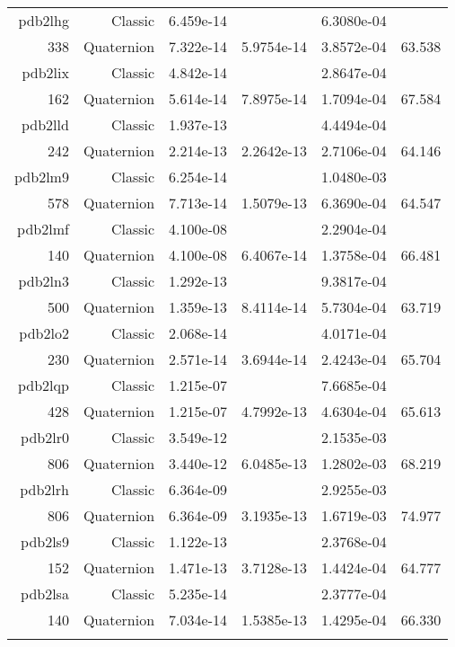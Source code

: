 \begin{xltabular}{\textwidth}{r|rS[table-format=1.3e+2]S[table-format=1.4e+2]S[table-format=1.4e+2]S[table-format=-1.3]}
pdb2lhg & Classic & 6.459e-14 &  & 6.3080e-04 & \\
338 & Quaternion & 7.322e-14 & 5.9754e-14 & 3.8572e-04 & 63.538\\  \addlinespace
pdb2lix & Classic & 4.842e-14 &  & 2.8647e-04 & \\
162 & Quaternion & 5.614e-14 & 7.8975e-14 & 1.7094e-04 & 67.584\\  \addlinespace
pdb2lld & Classic & 1.937e-13 &  & 4.4494e-04 & \\
242 & Quaternion & 2.214e-13 & 2.2642e-13 & 2.7106e-04 & 64.146\\  \addlinespace
pdb2lm9 & Classic & 6.254e-14 &  & 1.0480e-03 & \\
578 & Quaternion & 7.713e-14 & 1.5079e-13 & 6.3690e-04 & 64.547\\  \addlinespace
pdb2lmf & Classic & 4.100e-08 &  & 2.2904e-04 & \\
140 & Quaternion & 4.100e-08 & 6.4067e-14 & 1.3758e-04 & 66.481\\  \addlinespace
pdb2ln3 & Classic & 1.292e-13 &  & 9.3817e-04 & \\
500 & Quaternion & 1.359e-13 & 8.4114e-14 & 5.7304e-04 & 63.719\\  \addlinespace
pdb2lo2 & Classic & 2.068e-14 &  & 4.0171e-04 & \\
230 & Quaternion & 2.571e-14 & 3.6944e-14 & 2.4243e-04 & 65.704\\  \addlinespace
pdb2lqp & Classic & 1.215e-07 &  & 7.6685e-04 & \\
428 & Quaternion & 1.215e-07 & 4.7992e-13 & 4.6304e-04 & 65.613\\  \addlinespace
pdb2lr0 & Classic & 3.549e-12 &  & 2.1535e-03 & \\
806 & Quaternion & 3.440e-12 & 6.0485e-13 & 1.2802e-03 & 68.219\\  \addlinespace
pdb2lrh & Classic & 6.364e-09 &  & 2.9255e-03 & \\
806 & Quaternion & 6.364e-09 & 3.1935e-13 & 1.6719e-03 & 74.977\\  \addlinespace
pdb2ls9 & Classic & 1.122e-13 &  & 2.3768e-04 & \\
152 & Quaternion & 1.471e-13 & 3.7128e-13 & 1.4424e-04 & 64.777\\  \addlinespace
pdb2lsa & Classic & 5.235e-14 &  & 2.3777e-04 & \\
140 & Quaternion & 7.034e-14 & 1.5385e-13 & 1.4295e-04 & 66.330\\  \addlinespace

\end{xltabular}
